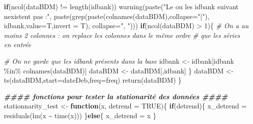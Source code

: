 \documentclass[
  11pt,
]{article}
\newenvironment{Shaded}{\begin{snugshade}}{\end{snugshade}}
\newcommand{\AttributeTok}[1]{\textcolor[rgb]{0.77,0.63,0.00}{#1}}
\newcommand{\CommentTok}[1]{\textcolor[rgb]{0.56,0.35,0.01}{\textit{#1}}}
\newcommand{\ConstantTok}[1]{\textcolor[rgb]{0.00,0.00,0.00}{#1}}
\newcommand{\ControlFlowTok}[1]{\textcolor[rgb]{0.13,0.29,0.53}{\textbf{#1}}}
\newcommand{\DecValTok}[1]{\textcolor[rgb]{0.00,0.00,0.81}{#1}}
\newcommand{\DocumentationTok}[1]{\textcolor[rgb]{0.56,0.35,0.01}{\textbf{\textit{#1}}}}
\newcommand{\FunctionTok}[1]{\textcolor[rgb]{0.00,0.00,0.00}{#1}}
\newcommand{\NormalTok}[1]{#1}
\newcommand{\OtherTok}[1]{\textcolor[rgb]{0.56,0.35,0.01}{#1}}
\newcommand{\SpecialCharTok}[1]{\textcolor[rgb]{0.00,0.00,0.00}{#1}}
\newcommand{\StringTok}[1]{\textcolor[rgb]{0.31,0.60,0.02}{#1}}
\begin{document}
\begin{Shaded}
\begin{Highlighting}[]
    \ControlFlowTok{if}\NormalTok{(}\FunctionTok{ncol}\NormalTok{(dataBDM) }\SpecialCharTok{!=} \FunctionTok{length}\NormalTok{(idbank))}
        \FunctionTok{warning}\NormalTok{(}\FunctionTok{paste}\NormalTok{(}\StringTok{"Le ou les idbank suivant n\textquotesingle{}existent pas :"}\NormalTok{,}
                      \FunctionTok{paste}\NormalTok{(}\FunctionTok{grep}\NormalTok{(}\FunctionTok{paste}\NormalTok{(}\FunctionTok{colnames}\NormalTok{(dataBDM),}\AttributeTok{collapse=}\StringTok{"|"}\NormalTok{),}
\NormalTok{                                 idbank,}\AttributeTok{value=}\NormalTok{T,}\AttributeTok{invert =}\NormalTok{ T),}
                            \AttributeTok{collapse=}\StringTok{", "}\NormalTok{)))}
    \ControlFlowTok{if}\NormalTok{(}\FunctionTok{ncol}\NormalTok{(dataBDM) }\SpecialCharTok{\textgreater{}} \DecValTok{1}\NormalTok{)\{}
        \CommentTok{\# On a au moins 2 colonnes : on replace les colonnes dans le même ordre }
        \CommentTok{\# que les séries en entrée}
        
        \CommentTok{\# On ne garde que les idbank présents dans la base}
\NormalTok{        idbank }\OtherTok{\textless{}{-}}\NormalTok{ idbank[idbank }\SpecialCharTok{\%in\%} \FunctionTok{colnames}\NormalTok{(dataBDM)]}
\NormalTok{        dataBDM }\OtherTok{\textless{}{-}}\NormalTok{ dataBDM[,idbank]}
\NormalTok{    \}}
\NormalTok{    dataBDM }\OtherTok{\textless{}{-}} \FunctionTok{ts}\NormalTok{(dataBDM,}\AttributeTok{start=}\NormalTok{dateDeb,}\AttributeTok{freq=}\NormalTok{freq)}
    \FunctionTok{return}\NormalTok{(dataBDM)}
\NormalTok{\}}

\DocumentationTok{\#\#\#\# fonctions pour tester la stationarité des données \#\#\#\#}
\NormalTok{stationnarity\_test }\OtherTok{\textless{}{-}} \ControlFlowTok{function}\NormalTok{(x, }\AttributeTok{detrend =} \ConstantTok{TRUE}\NormalTok{)\{}
    \ControlFlowTok{if}\NormalTok{(detrend)\{}
\NormalTok{        x\_detrend }\OtherTok{=} \FunctionTok{residuals}\NormalTok{(}\FunctionTok{lm}\NormalTok{(x }\SpecialCharTok{\textasciitilde{}} \FunctionTok{time}\NormalTok{(x)))}
\NormalTok{    \}}\ControlFlowTok{else}\NormalTok{\{}
\NormalTok{        x\_detrend }\OtherTok{=}\NormalTok{ x}
\NormalTok{    \}}
    

\end{Highlighting}
\end{Shaded}
\end{document}
